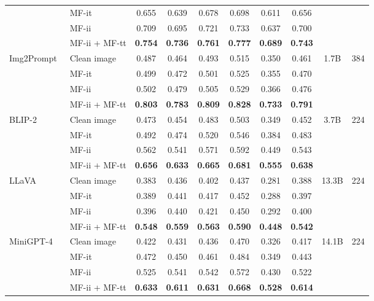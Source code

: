 \begin{table}[t]
\begin{adjustbox}{width=\textwidth}
\begin{tabular}{ ll | cccccc | cc }
         & {MF-it} & 0.655 & 0.639 & 0.678 & 0.698 & 0.611 & 0.656
         \\
         & {MF-ii} & 0.709 & 0.695 & 0.721 & 0.733 & 0.637 & 0.700 & & \\
         & {MF-ii + MF-tt} & \textbf{0.754} & \textbf{0.736} & \textbf{0.761} & \textbf{0.777} & \textbf{0.689} & \textbf{0.743} \\
         \midrule
         \multirow{4}{*}{Img2Prompt~\citep{guoimages}}
         & {Clean image} & 0.487 & 0.464 & 0.493 & 0.515 & 0.350 & 0.461 & \multirow{4}{*}{1.7B} & \multirow{4}{*}{384} \\
         & {MF-it} & 0.499 & 0.472 & 0.501 & 0.525 & 0.355 & 0.470
         \\
         & {MF-ii} & 0.502 & 0.479 & 0.505 & 0.529 & 0.366 & 0.476  \\
         & {MF-ii + MF-tt} & \textbf{0.803} & \textbf{0.783} & \textbf{0.809} & \textbf{0.828} & \textbf{0.733} & \textbf{0.791} \\
         \midrule
         \multirow{4}{*}{BLIP-2~\citep{li2023blip}}
         & {Clean image} & 0.473 & 0.454 & 0.483 & 0.503 & 0.349 & 0.452 & \multirow{4}{*}{3.7B} & \multirow{4}{*}{224} \\
         & {MF-it} & 0.492 & 0.474 & 0.520 & 0.546 & 0.384 & 0.483
         \\
         & {MF-ii} & 0.562 & 0.541 & 0.571 & 0.592 & 0.449 & 0.543 & & \\
         & {MF-ii + MF-tt} & \textbf{0.656} & \textbf{0.633} & \textbf{0.665} & \textbf{0.681} & \textbf{0.555} & \textbf{0.638} \\
         \midrule
         \multirow{4}{*}{LLaVA~\citep{liu2023llava}}
         & {Clean image} & 0.383 & 0.436 & 0.402 & 0.437 & 0.281 & 0.388 & \multirow{4}{*}{13.3B} & \multirow{4}{*}{224} \\
         & {MF-it} & 0.389 & 0.441 & 0.417 & 0.452 & 0.288 & 0.397
         \\
         & {MF-ii} & 0.396 & 0.440 & 0.421 & 0.450 & 0.292 & 0.400 \\
         & {MF-ii + MF-tt} & \textbf{0.548} & \textbf{0.559} & \textbf{0.563} & \textbf{0.590} & \textbf{0.448} & \textbf{0.542}\\
         \midrule
         \multirow{4}{*}{MiniGPT-4~\citep{zhu2023minigpt}}
         & {Clean image} & 0.422 & 0.431 & 0.436 & 0.470 & 0.326 & 0.417 & \multirow{4}{*}{14.1B} & \multirow{4}{*}{224}\\
         & {MF-it} & 0.472 & 0.450 & 0.461 & 0.484 & 0.349 & 0.443
         \\
         & {MF-ii} & 0.525 & 0.541 & 0.542 & 0.572 & 0.430 & 0.522 \\
         & {MF-ii + MF-tt} & \textbf{0.633} & \textbf{0.611} & \textbf{0.631} & \textbf{0.668} & \textbf{0.528} & \textbf{0.614} \\
    \bottomrule[1.5pt]
    \end{tabular}
    \end{adjustbox}
    \label{table:2}
\end{table}%


